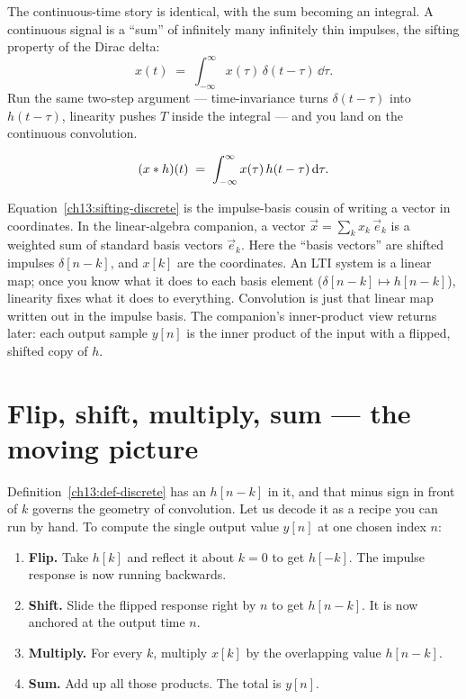 The continuous-time story is identical, with the sum becoming an integral. A
continuous signal is a ``sum'' of infinitely many infinitely thin impulses, the
sifting property of the Dirac delta:
\begin{equation}
\label{ch13:sifting-cont}
x(t) \;=\; \int_{-\infty}^{\infty} x(\tau)\,\delta(t-\tau)\,\dd\tau .
\end{equation}
Run the same two-step argument --- time-invariance turns $\delta(t-\tau)$ into
$h(t-\tau)$, linearity pushes $T$ inside the integral --- and you land on the
continuous convolution.

\begin{definition}
\label{ch13:def-cont}
\begin{equation}
(x \ast h)(t) \;=\; \int_{-\infty}^{\infty} x(\tau)\,h(t-\tau)\,\mathrm{d}\tau .
\end{equation}
\end{definition}

\begin{connectionbox}
Equation~\eqref{ch13:sifting-discrete} is the impulse-basis cousin of writing a
vector in coordinates. In the linear-algebra companion, a vector
$\vec{x} = \sum_k x_k\,\vec{e}_k$ is a weighted sum of standard basis vectors
$\vec{e}_k$. Here the ``basis vectors'' are shifted impulses $\delta[n-k]$, and
$x[k]$ are the coordinates. An LTI system is a linear map; once you know what it
does to each basis element ($\delta[n-k] \mapsto h[n-k]$), linearity fixes what
it does to everything. Convolution is just that linear map written out in the
impulse basis. The companion's inner-product view returns later: each output
sample $y[n]$ is the inner product of the input with a flipped, shifted copy of
$h$.
\end{connectionbox}

\section{Flip, shift, multiply, sum --- the moving picture}
\label{ch13:flipshift}

Definition~\ref{ch13:def-discrete} has an $h[n-k]$ in it, and that minus sign in
front of $k$ governs the geometry of convolution. Let us decode it as a
recipe you can run by hand. To compute the single output value $y[n]$ at one
chosen index $n$:

\begin{enumerate}
\item \textbf{Flip.} Take $h[k]$ and reflect it about $k=0$ to get $h[-k]$. The
impulse response is now running backwards.
\item \textbf{Shift.} Slide the flipped response right by $n$ to get $h[n-k]$.
It is now anchored at the output time $n$.
\item \textbf{Multiply.} For every $k$, multiply $x[k]$ by the overlapping value
$h[n-k]$.
\item \textbf{Sum.} Add up all those products. The total is $y[n]$.
\end{enumerate}


